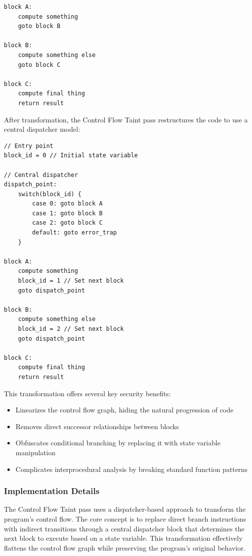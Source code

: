 \documentclass[conference]{IEEEtran}
\begin{document}
\begin{lstlisting}[style=pseudocode]
block A:
    compute something
    goto block B

block B:
    compute something else
    goto block C

block C:
    compute final thing
    return result
\end{lstlisting}

After transformation, the Control Flow Taint pass restructures the code to use a central dispatcher model:

\begin{lstlisting}[style=pseudocode]
// Entry point
block_id = 0 // Initial state variable

// Central dispatcher
dispatch_point:
    switch(block_id) {
        case 0: goto block A
        case 1: goto block B
        case 2: goto block C
        default: goto error_trap
    }

block A:
    compute something
    block_id = 1 // Set next block
    goto dispatch_point

block B:
    compute something else
    block_id = 2 // Set next block
    goto dispatch_point

block C:
    compute final thing
    return result
\end{lstlisting}

This transformation offers several key security benefits:
\begin{itemize}
    \item Linearizes the control flow graph, hiding the natural progression of code
    \item Removes direct successor relationships between blocks
    \item Obfuscates conditional branching by replacing it with state variable manipulation
    \item Complicates interprocedural analysis by breaking standard function patterns
\end{itemize}

\subsubsection{Implementation Details}
The Control Flow Taint pass uses a dispatcher-based approach to transform the program's control flow. The core concept is to replace direct branch instructions with indirect transitions through a central dispatcher block that determines the next block to execute based on a state variable. This transformation effectively flattens the control flow graph while preserving the program's original behavior.
\end{document}
